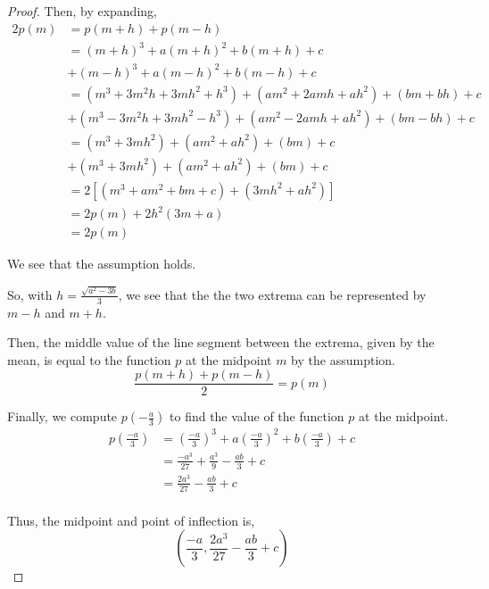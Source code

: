 \documentclass[../hw4.tex]{subfiles}
\begin{document}
\begin{proof}
    Then, by expanding,
    \begin{align*}
        2p(m) &= p(m+h)+p(m-h) \\
        &= {(m+h)}^3+a{(m+h)}^2+b(m+h)+c \\
        &+ {(m-h)}^3+a{(m-h)}^2+b(m-h)+c \\
        &= (m^3+3m^2h+3mh^2+h^3)+(am^2+2amh+ah^2)+(bm+bh)+c \\
        &+ (m^3-3m^2h+3mh^2-h^3)+(am^2-2amh+ah^2)+(bm-bh)+c \\
        &= (m^3+3mh^2)+(am^2+ah^2)+(bm)+c \\
        &+ (m^3+3mh^2)+(am^2+ah^2)+(bm)+c \\
        &= 2\left[ (m^3+am^2+bm+c) + (3mh^2+ah^2) \right] \\
        &= 2p(m) + 2h^2(3m+a) \\
        &= 2p(m)
    \end{align*}

    We see that the assumption holds.

    So, with $h=\frac{\sqrt{a^2-3b}}{3}$, we see that the the two extrema can be represented by $m-h$ and $m+h$.
    
    Then, the middle value of the line segment between the extrema, given by the mean, is equal to the function $p$ at the midpoint $m$ by the assumption.
    \[\frac{p(m+h)+p(m-h)}{2} = p(m)\]

    Finally, we compute $p\left( -\frac{a}{3} \right)$ to find the value of the function $p$ at the midpoint.
    \begin{align*}
        p\left(\frac{-a}{3}\right) &= {\left(\frac{-a}{3}\right)}^3 + a{\left(\frac{-a}{3}\right)}^2+b\left(\frac{-a}{3}\right) + c \\
        &= \frac{-a^3}{27} + \frac{a^3}{9} - \frac{ab}{3} + c \\
        &= \frac{2a^3}{27} - \frac{ab}{3} + c \\
    \end{align*}

    Thus, the midpoint and point of inflection is, \[\left( \frac{-a}{3}, \frac{2a^3}{27} - \frac{ab}{3} + c \right)\]

\end{proof}
\end{document}
